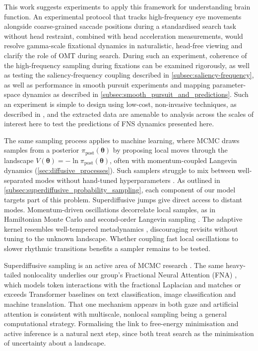 This work suggests experiments to apply this framework for understanding brain function. An experimental protocol that tracks high-frequency eye movements alongside coarse-grained saccade positions during a standardised search task without head restraint, combined with head acceleration measurements, would resolve gamma-scale fixational dynamics in naturalistic, head-free viewing and clarify the role of OMT during search. During such an experiment, coherence of the high-frequency sampling during fixations can be examined rigorously, as well as testing the saliency-frequency coupling described in \cref{subsec:saliency-frequency}, as well as performance in smooth pursuit experiments and mapping parameter-space dynamics as described in \cref{subsec:smooth_pursuit_and_predictions}. Such an experiment is simple to design using low-cost, non-invasive techniques, as described in \cite{ryle_simultaneous_2015}, and the extracted data are amenable to analysis across the scales of interest here to test the predictions of FNS dynamics presented here.

The same sampling process applies to machine learning, where MCMC draws samples from a posterior $\pi_{\text{post}}(\bm{\theta})$ by proposing local moves through the landscape $V(\bm{\theta}) = -\ln \pi_{\text{post}}(\bm{\theta})$, often with momentum-coupled Langevin dynamics (\cref{sec:diffusive_processes}). Such samplers struggle to mix between well-separated modes without hand-tuned hyperparameters \cite{neal_sampling_1996, latuszynski_mcmc_2025, speagle_conceptual_2020}. As outlined in \cref{subsec:superdiffusive_probability_sampling}, each component of our model targets part of this problem. Superdiffusive jumps give direct access to distant modes. Momentum-driven oscillations decorrelate local samples, as in Hamiltonian Monte Carlo \cite{betancourt_conceptual_2018, Ottobre2016-xp} and second-order Langevin sampling \cite{liu2025secondorderensemblelangevin, Ottobre2016-xp}. The adaptive kernel resembles well-tempered metadynamics \cite{tiwary_time-independent_2015}, discouraging revisits without tuning to the unknown landscape. Whether coupling fast local oscillations to slower rhythmic transitions benefits a sampler remains to be tested.

Superdiffusive sampling is an active area of MCMC research \cite{simsekli_fractional_nodate, ijcai2018p419, latuszynski_mcmc_2025, oechsler_levy_2024, behme_levy_2026}. The same heavy-tailed nonlocality underlies our group's Fractional Neural Attention (FNA) \cite{qu2025fractionalneuralattentionefficient}, which models token interactions with the fractional Laplacian and matches or exceeds Transformer baselines on text classification, image classification and machine translation. That one mechanism appears in both gaze and artificial attention is consistent with multiscale, nonlocal sampling being a general computational strategy. Formalising the link to free-energy minimisation and active inference \cite{NIPS2017_194cf6c2, tiwary_time-independent_2015, bussi_using_2020, Friston2010-aa, parr_active_2022} is a natural next step, since both treat search as the minimisation of uncertainty about a landscape.


